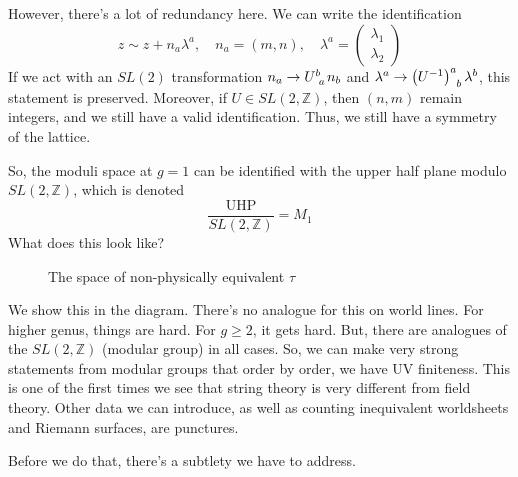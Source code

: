 \documentclass[11pt, oneside]{article}   	%
\theoremstyle{slanted}
\begin{document}
\begin{itemize}
However, there's a lot of redundancy here. 
We can write the identification
\[
 z \sim z + n_ a \lambda ^ a , \quad n _a   = \left( m , n  \right)  , \quad 
 \lambda ^ a  = \begin{pmatrix}  \lambda _ 1 \\ \lambda _ 2  \end{pmatrix} 
\] If we act with an $SL(2 )  $ transformation
$ n _ a \to U \indices{ ^ b _ a  } n _ b  $ and $ \lambda ^ a \to \left( U ^{ -  1 }  \right)  
\indices{ ^ a _ b  } \lambda ^ b  $, 
this statement is preserved. 
Moreover, if $ U \in SL \left( 2, \mathbb{ Z  }  \right)  $, 
then $ \left( n , m  \right)  $ remain integers, and 
we still have a valid identification. 
Thus, we still have a symmetry 
of the lattice. 

So, the moduli space at $ g  = 1 $ 
can be identified with 
the upper half plane modulo $ SL \left( 2, \mathbb{Z  }   \right)  $, which 
is denoted 
\[
	\frac{\text{UHP}}{SL\left( 2, \mathbb{ Z }   \right)  } = M _ 1 
\] What does this look like? 

\begin{figure}[htpb]
	\centering
	
	\caption{The space of non-physically equivalent $ \tau $ }%
	\label{fig:}
\end{figure}
\end{itemize}
We show this in the diagram. 
There's no analogue for this 
on world lines. 
For higher genus, things are hard. For $ g \geq 2 $, 
it gets hard. But, there are analogues of the $ SL \left( 2, \mathbb{ Z }  \right)  $
(modular group) in all cases. So, 
we can make very strong statements from modular groups 
that order by order, we have UV finiteness. 
This is one of the first times we see that string 
theory is very different from field theory. 
Other data we can introduce, as well as counting 
inequivalent worldsheets and Riemann surfaces, 
are punctures. 

Before we do that, there's 
a subtlety we have to address. 
\end{document}
